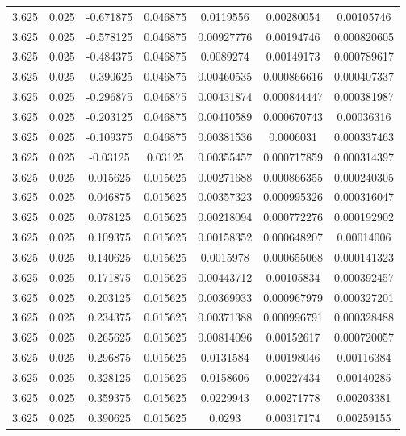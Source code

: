 \begin{table}[bh]
\begin{center}
{\begin{tabular}{ccccccc}
3.625	 & 0.025 & 	-0.671875	 & 0.046875	 & 0.0119556	 & 0.00280054	 & 0.00105746 \\ 
3.625	 & 0.025 & 	-0.578125	 & 0.046875	 & 0.00927776	 & 0.00194746	 & 0.000820605 \\ 
3.625	 & 0.025 & 	-0.484375	 & 0.046875	 & 0.0089274	 & 0.00149173	 & 0.000789617 \\ 
3.625	 & 0.025 & 	-0.390625	 & 0.046875	 & 0.00460535	 & 0.000866616	 & 0.000407337 \\ 
3.625	 & 0.025 & 	-0.296875	 & 0.046875	 & 0.00431874	 & 0.000844447	 & 0.000381987 \\ 
3.625	 & 0.025 & 	-0.203125	 & 0.046875	 & 0.00410589	 & 0.000670743	 & 0.00036316 \\ 
3.625	 & 0.025 & 	-0.109375	 & 0.046875	 & 0.00381536	 & 0.0006031	 & 0.000337463 \\ 
3.625	 & 0.025 & 	-0.03125	 & 0.03125	 & 0.00355457	 & 0.000717859	 & 0.000314397 \\ 
3.625	 & 0.025 & 	0.015625	 & 0.015625	 & 0.00271688	 & 0.000866355	 & 0.000240305 \\ 
3.625	 & 0.025 & 	0.046875	 & 0.015625	 & 0.00357323	 & 0.000995326	 & 0.000316047 \\ 
3.625	 & 0.025 & 	0.078125	 & 0.015625	 & 0.00218094	 & 0.000772276	 & 0.000192902 \\ 
3.625	 & 0.025 & 	0.109375	 & 0.015625	 & 0.00158352	 & 0.000648207	 & 0.00014006 \\ 
3.625	 & 0.025 & 	0.140625	 & 0.015625	 & 0.0015978	 & 0.000655068	 & 0.000141323 \\ 
3.625	 & 0.025 & 	0.171875	 & 0.015625	 & 0.00443712	 & 0.00105834	 & 0.000392457 \\ 
3.625	 & 0.025 & 	0.203125	 & 0.015625	 & 0.00369933	 & 0.000967979	 & 0.000327201 \\ 
3.625	 & 0.025 & 	0.234375	 & 0.015625	 & 0.00371388	 & 0.000996791	 & 0.000328488 \\ 
3.625	 & 0.025 & 	0.265625	 & 0.015625	 & 0.00814096	 & 0.00152617	 & 0.000720057 \\ 
3.625	 & 0.025 & 	0.296875	 & 0.015625	 & 0.0131584	 & 0.00198046	 & 0.00116384 \\ 
3.625	 & 0.025 & 	0.328125	 & 0.015625	 & 0.0158606	 & 0.00227434	 & 0.00140285 \\ 
3.625	 & 0.025 & 	0.359375	 & 0.015625	 & 0.0229943	 & 0.00271778	 & 0.00203381 \\ 
3.625	 & 0.025 & 	0.390625	 & 0.015625	 & 0.0293	 & 0.00317174	 & 0.00259155 \\ 

\end{tabular}}
\end{center}
\end{table}
